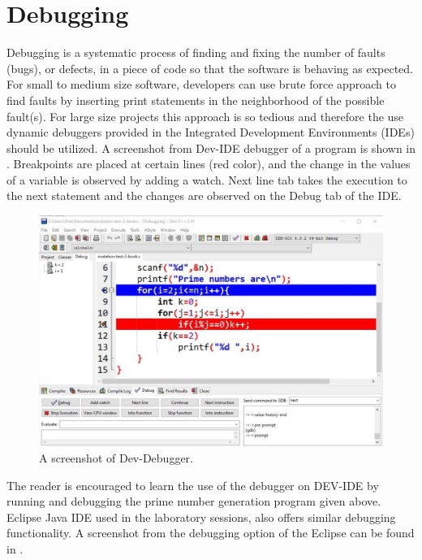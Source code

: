 \section{Debugging}
Debugging is a systematic process of finding and fixing the number of faults (bugs), or defects, in a piece of code so that the software is behaving as expected. For small to medium size software, developers can use brute force approach to find faults by inserting print statements in the neighborhood of the possible fault(s). For large size projects this approach is so tedious and therefore the use dynamic debuggers provided in the Integrated Development Environments (IDEs) should be utilized. A screenshot from Dev-\CC IDE debugger of a program is shown in . Breakpoints are placed at certain lines (red color), and the change in the values of a variable is observed by adding a watch. Next line tab takes the execution to the next statement and the changes are observed on the Debug tab of the IDE.

\begin{figure}[!ht]
    \includegraphics{images/dev-c-debugger.jpg}
    \caption{A screenshot of Dev-\CC Debugger.}
\end{figure}
 
The reader is encouraged to learn the use of the debugger on DEV-\CC IDE by running and debugging the prime number generation program given above. Eclipse Java IDE used in the laboratory sessions, also offers similar debugging functionality. A screenshot from the debugging option of the Eclipse can be found in .

